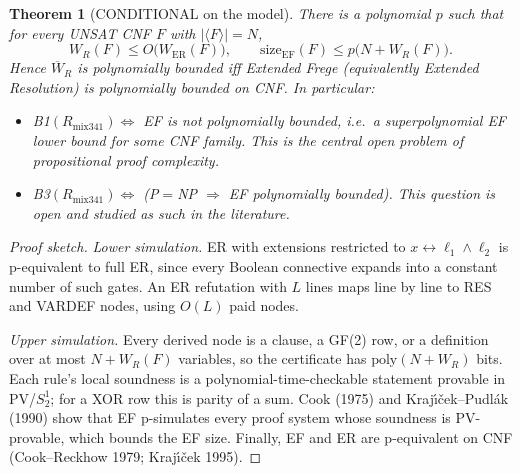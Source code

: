 \documentclass[11pt]{article}
\newtheorem{theorem}{Theorem}
\theoremstyle{remark}
\begin{document}
\begin{theorem}[CONDITIONAL on the model]\label{thm:ef}
There is a polynomial $p$ such that for every UNSAT CNF $F$ with $|\langle F\rangle|=N$,
\[
W_R(F)\le O\bigl(W_{\mathrm{ER}}(F)\bigr),\qquad
\mathrm{size}_{\mathrm{EF}}(F)\le p\bigl(N+W_R(F)\bigr).
\]
Hence $\overline W_R$ is polynomially bounded iff Extended Frege (equivalently Extended Resolution) is polynomially bounded on CNF. In particular:
\begin{itemize}
\item B1$(R_{\mathrm{mix341}})\iff$ EF is not polynomially bounded, i.e.\ a superpolynomial EF lower bound for some CNF family. This is the central open problem of propositional proof complexity.
\item B3$(R_{\mathrm{mix341}})\iff$ (P$=$NP $\Rightarrow$ EF polynomially bounded). This question is open and studied as such in the literature.
\end{itemize}
\end{theorem}
\begin{proof}[Proof sketch]
\emph{Lower simulation.} ER with extensions restricted to $x\leftrightarrow\ell_1\wedge\ell_2$ is p-equivalent to full ER, since every Boolean connective expands into a constant number of such gates. An ER refutation with $L$ lines maps line by line to RES and VARDEF nodes, using $O(L)$ paid nodes.

\emph{Upper simulation.} Every derived node is a clause, a GF(2) row, or a definition over at most $N+W_R(F)$ variables, so the certificate has $\mathrm{poly}(N+W_R)$ bits. Each rule's local soundness is a polynomial-time-checkable statement provable in PV/$S^1_2$; for a XOR row this is parity of a sum. Cook (1975) and Kraj\'\i\v{c}ek--Pudl\'ak (1990) show that EF p-simulates every proof system whose soundness is PV-provable, which bounds the EF size. Finally, EF and ER are p-equivalent on CNF (Cook--Reckhow 1979; Kraj\'\i\v{c}ek 1995).
\end{proof}
\end{document}
